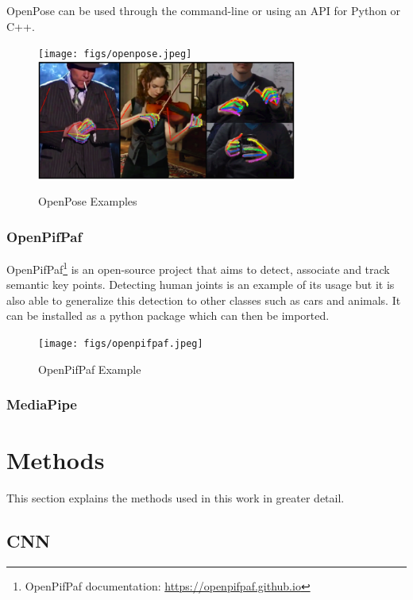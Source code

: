 OpenPose can be used through the command-line or using an API for Python or C++.

\begin{figure}[h]
\centerline{\texttt{[image: figs/openpose.jpeg]}\includegraphics[height=1.55in]{figs/openpose2.PNG}}
\caption[OpenPose Examples]{OpenPose Examples \cite{Cao2021,Simon2017}}
\label{openpose}
\end{figure}

\subsubsection{OpenPifPaf}

OpenPifPaf\cite{Kreiss2021,Kreiss2019}\footnote{OpenPifPaf documentation: \url{https://openpifpaf.github.io}} is an open-source project that aims to detect, associate and track semantic key points. Detecting human joints is an example of its usage but it is also able to generalize this detection to other classes such as cars and animals. It can be installed as a python package which can then be imported.

\begin{figure}[h]
\centerline{\texttt{[image: figs/openpifpaf.jpeg]}}
\caption[OpenPifPaf Example]{OpenPifPaf Example \cite{Kreiss2021}}
\label{openpifpaf}
\end{figure}

\subsubsection{MediaPipe}

\section{Methods}

This section explains the methods used in this work in greater detail.

\subsection{CNN}

